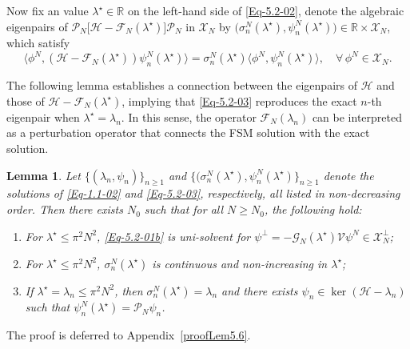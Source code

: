 \documentclass{sn-jnl}%
\numberwithin{equation}{section}
\theoremstyle{thmstyleone}%
\newtheorem{lemma}{Lemma}[section]%
\theoremstyle{thmstyletwo}%
\theoremstyle{thmstylethree}%
\begin{document}
Now fix an value $\lambda^{\star} \in \mathbb{R}$ on the left-hand side of \eqref{Eq-5.2-02}, denote the algebraic eigenpairs of $\mathcal{P}_N\bigl[\mathcal{H}-\mathcal{F}_N(\lambda^\star)\bigr]\mathcal{P}_N$ in $\mathscr{X}_N$ by
$\big( \sigma_n^N(\lambda^{\star}), \psi^N_n(\lambda^{\star}) \bigr) \in \mathbb{R} \times \mathscr{X}_N$, which satisfy
\begin{equation}
\label{Eq-5.2-03}
       \langle \phi^N, (\mathcal{H}-\mathcal{F}_N(\lambda^{\star}))\psi^N_n(\lambda^{\star}) \rangle  = \sigma_n^N(\lambda^{\star}) \langle \phi^N, \psi^N_n(\lambda^{\star})\rangle,\quad \forall\,\phi^N\in \mathscr{X}_N.
\end{equation}

The following lemma establishes a connection between the eigenpairs of $\mathcal{H}$ and those of $\mathcal{H}-\mathcal{F}_N(\lambda^\star)$,
implying that \eqref{Eq-5.2-03} reproduces the exact $n$-th eigenpair when $\lambda^{\star} = \lambda_n$. In this sense, the operator $\mathcal{F}_N(\lambda_n)$ can be interpreted as a perturbation operator that connects the FSM solution with the exact solution.
\begin{lemma}\label{Lem5.6}
    Let 
    $\{(\lambda_n,\psi_n)\}_{n\geq 1}$
    and $\{(\sigma_n^N(\lambda^{\star}),\psi^N_n(\lambda^{\star})\}_{n\geq 1}$ denote the solutions of \eqref{Eq-1.1-02} and \eqref{Eq-5.2-03}, respectively, all listed in non-decreasing order. Then there exists $N_0$ such that for all $N\geq N_0$, the following hold:
    
    \begin{enumerate}
    \item[$\mathrm{(i)}$] For $\lambda^{\star}\leq \pi^2N^2$, \eqref{Eq-5.2-01b} is uni-solvent for $\psi^\perp =-\mathcal{G}_N(\lambda^\star) \mathcal{V} \psi^N\in \mathscr{X}_N^\perp$;
    
    \item[$\mathrm{(ii)}$] For $\lambda^{\star} \leq \pi^2 N^2$,  $\sigma_n^N(\lambda^{\star})$ is continuous and non-increasing in $\lambda^{\star}$;
    
    \item[$\mathrm{(iii)}$] If $\lambda^\star=\lambda_n \leq \pi^2N^2$, then $\sigma_n^N(\lambda^\star) = \lambda_n$ and there exists $\psi_n \in \ker(\mathcal{H}-\lambda_n)$ such that $\psi^N_n(\lambda^\star) = \mathcal{P}_N\psi_n$.
    \end{enumerate}
\end{lemma}

The proof is deferred to Appendix~\ref{proofLem5.6}.
\end{document}
